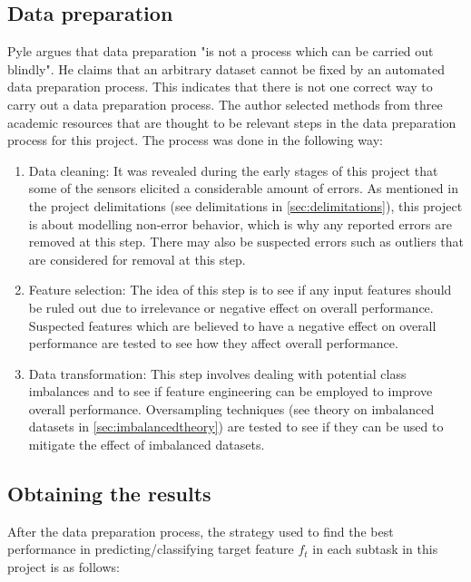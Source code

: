 	\subsection{Data preparation} \label{sec:method_dataprep}
		Pyle \cite{BOOK:15} argues that data preparation "is not a process which can be carried out blindly". He claims that an arbitrary dataset cannot be fixed by an automated data preparation process. This indicates that there is not one correct way to carry out a data preparation process. The author selected methods from three academic resources \cite{BOOK:15, BOOK:16, BOOK:17} that are thought to be relevant steps in the data preparation process for this project. The process was done in the following way:
	\begin{enumerate}
		\item{Data cleaning: } It was revealed during the early stages of this project that some of the sensors elicited a considerable amount of errors. As mentioned in the project delimitations (see delimitations in \ref{sec:delimitations}), this project is about modelling non-error behavior, which is why any reported errors are removed at this step. There may also be suspected errors such as outliers that are considered for removal at this step.
		\item{Feature selection: } The idea of this step is to see if any input features should be ruled out due to irrelevance or negative effect on overall performance. Suspected features which are believed to have a negative effect on overall performance are tested to see how they affect overall performance. %
		\item{Data transformation: } This step involves dealing with potential class imbalances and to see if feature engineering can be employed to improve overall performance. Oversampling techniques (see theory on imbalanced datasets in \ref{sec:imbalancedtheory}) are tested to see if they can be used to mitigate the effect of imbalanced datasets.
	\end{enumerate}

	\subsection{Obtaining the results} \label{sec:method_results}
			After the data preparation process, the strategy used to find the best performance in predicting/classifying target feature $f_t$ in each subtask in this project is as follows:

